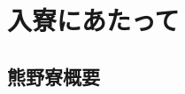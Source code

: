 \documentclass[10pt,b5jsbook,dvips,dvipdfmx,openany]{jsbook}
\theoremstyle{definition}
\begin{document}
  

\setcounter{page}{1}
  \setcounter{tocdepth}{1}
  \tableofcontents
    \thispagestyle{empty}  

  \newpage

  

\chapter{入寮にあたって}
	\section{熊野寮概要} \label{sec:abst}
\end{document}
